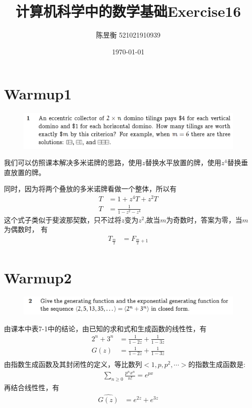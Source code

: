 \documentclass[]{article}
\title{计算机科学中的数学基础Exercise16}
\author{陈昱衡 521021910939}
\date{\today}
\begin{document}
\maketitle


\section*{Warmup1}
\begin{figure}[H]
    \includegraphics[scale = 0.6]{2023-04-06-10-50-30.png}
\end{figure}
我们可以仿照课本解决多米诺牌的思路，使用$z$替换水平放置的牌，使用$z^4$替换垂直放置的牌。\par 
同时，因为将两个叠放的多米诺牌看做一个整体，所以有
\begin{align}
    T &= 1 + z^4 T  + z^2 T\\
    T &= \frac{1}{1 - z^2 - z^4}
\end{align}
这个式子类似于斐波那契数，只不过将$z$变为$z^2$,故当$m$为奇数时，答案为零，当$m$为偶数时，
有
\begin{align}
    T_{\frac{m}{2}} &= F_{\frac{m}{2}+1}\\
\end{align}

\section*{Warmup2}
\begin{figure}[H]
    \includegraphics[scale = 0.6]{2023-04-06-10-51-32.png}
\end{figure}
由课本中表7-1中的结论，由已知的求和式和生成函数的线性性，有
\begin{align}
    2^n + 3^n &= \frac{1}{1-2z} + \frac{1}{1-3z}\\
    G(z) &= \frac{1}{1-2z} + \frac{1}{1-3z}\\
\end{align}
由指数生成函数及其封闭性的定义，等比数列$<1,p,p^2,\cdots>$的指数生成函数是:
\begin{align}
    \sum_{n \ge 0}\frac{p^n x^n}{n!} = e^{px}
\end{align}
再结合线性性，有
\begin{align}
    \hat{G(z)} &= e^{2z}+e^{3z}\\
\end{align}
\end{document}
